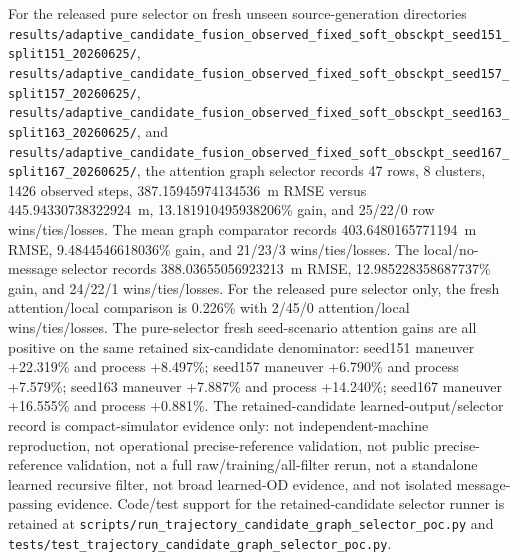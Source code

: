 \documentclass{article}
\begin{document}
For the released pure selector on fresh unseen source-generation directories \nolinkurl{results/adaptive_candidate_fusion_observed_fixed_soft_obsckpt_seed151_split151_20260625/}, \nolinkurl{results/adaptive_candidate_fusion_observed_fixed_soft_obsckpt_seed157_split157_20260625/}, \nolinkurl{results/adaptive_candidate_fusion_observed_fixed_soft_obsckpt_seed163_split163_20260625/}, and \nolinkurl{results/adaptive_candidate_fusion_observed_fixed_soft_obsckpt_seed167_split167_20260625/}, the attention graph selector records 47 rows, 8 clusters, 1426 observed steps, 387.15945974134536~m RMSE versus 445.94330738322924~m, 13.181910495938206\% gain, and 25/22/0 row wins/ties/losses. The mean graph comparator records 403.6480165771194~m RMSE, 9.4844546618036\% gain, and 21/23/3 wins/ties/losses. The local/no-message selector records 388.03655056923213~m RMSE, 12.985228358687737\% gain, and 24/22/1 wins/ties/losses. For the released pure selector only, the fresh attention/local comparison is 0.226\% with 2/45/0 attention/local wins/ties/losses. The pure-selector fresh seed-scenario attention gains are all positive on the same retained six-candidate denominator: seed151 maneuver +22.319\% and process +8.497\%; seed157 maneuver +6.790\% and process +7.579\%; seed163 maneuver +7.887\% and process +14.240\%; seed167 maneuver +16.555\% and process +0.881\%. The retained-candidate learned-output/selector record is compact-simulator evidence only: not independent-machine reproduction, not operational precise-reference validation, not public precise-reference validation, not a full raw/training/all-filter rerun, not a standalone learned recursive filter, not broad learned-OD evidence, and not isolated message-passing evidence. Code/test support for the retained-candidate selector runner is retained at \nolinkurl{scripts/run_trajectory_candidate_graph_selector_poc.py} and \nolinkurl{tests/test_trajectory_candidate_graph_selector_poc.py}.
\end{document}
